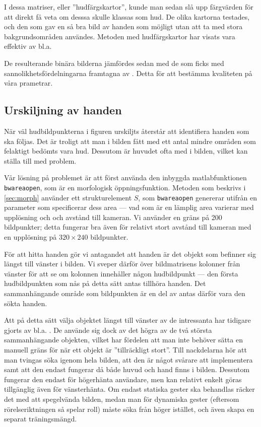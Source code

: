 I dessa matriser, eller
''hudfärgskartor'', kunde man sedan slå upp
färgvärden för att direkt få veta om desssa skulle klassas som hud.
De olika kartorna testades, och den som gav en så bra bild av
handen som möjligt utan att ta med stora bakgrundsområden användes.
Metoden med hudfärgskartor har visats vara effektiv av bl.a.~

De resulterande binära bilderna jämfördes sedan med de som ficks med
sannolikhetsfördelningarna framtagna av . Detta
för att bestämma kvaliteten på våra prametrar.

\subsection{Urskiljning av handen}\label{sec:metod_hud:urskiljning}
När väl hudbildpunkterna i figuren urskiljts återstår att 
identifiera handen som ska följas. Det är troligt att man i bilden
fått med ett antal mindre områden som felaktigt bedömts vara
hud. Dessutom är huvudet ofta med i bilden, vilket kan ställa till med
problem. 

Vår lösning på problemet är att först använda den inbyggda
matlabfunktionen \texttt{bwareaopen}, som är en morfologisk
öppningsfunktion. Metoden som beskrivs i
\ref{sec:morph} använder ett strukturelement $S$, som \texttt{bwareaopen}
genererar utifrån en parameter som specificerar
dess area --- vad som är en lämplig area
varierar med upplösning och
och avstånd till kameran. Vi använder en gräns på 200
bildpunkter; detta fungerar bra även för relativt stort avstånd till
kameran med en upplösning på $320\times240$ bildpunkter.

För att hitta handen gör vi antagandet att handen är det
objekt som befinner sig längst till vänster i bilden.
Vi sveper därför över bildmatrisens kolonner från
vänster för att se om kolonnen innehåller någon hudbildpunkt --- den första
hudbildpunkten som nås på detta sätt antas tillhöra handen.
Det sammanhängande område som bildpunkten är en del av antas därför vara
den sökta handen.

Att på detta sätt välja objektet längst till vänster av de
intressanta har tidigare gjorts av bl.a. . De använde
sig dock av det högra av de två största sammanhängande objekten,
vilket har fördelen att man inte behöver sätta en manuell gräns för
när ett objekt är ''tillräckligt stort''.
Till nackdelarna hör
att man tvingas
söka igenom hela bilden, att den är något svårare att
implementera samt att den endast fungerar då både huvud och hand finns
i bilden. Dessutom fungerar den endast för högerhänta användare, men kan
relativt enkelt göras tillgänglig även för vänsterhänta. Om endast statiska
gester ska behandlas räcker det med att spegelvända bilden, medan man för
dynamiska gester (eftersom rörelseriktningen så spelar roll) måste söka från
höger istället, och även skapa en separat träningsmängd.

